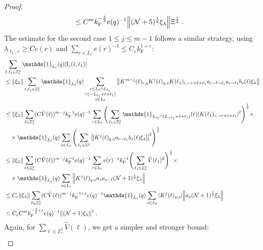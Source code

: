 \documentclass[12pt,a4paper]{article}
\numberwithin{equation}{section}
\newcommand{\1}{\mathbb{I}}
\newcommand{\F}{\mathrm{F}}
\newcommand{\I}{\mathrm{I}}
\newcommand{\Z}{\mathbb{Z}}
\newcommand{\NN}{\mathcal{N}}
\newcommand{\half}{\frac{1}{2}}
\theoremstyle{plain}
\theoremstyle{definition}
\theoremstyle{remark}
\theoremstyle{plain}
\theoremstyle{definition}
\theoremstyle{remark}
\begin{document}
\begin{proof}
\begin{align}
	 &\leq C^m
	 	k_{\F}^{-\frac 32} e(q)^{-1}
	 	\norm{(\NN+5)^{\half} \xi_\lambda}
	 	\Xi^{\half} \;.
\label{eq:estEQ1121}
\end{align}
The estimate for the second case $ 1 \le j \le m-1 $ follows a similar strategy, using $ \lambda_{\ell_1,r} \ge C e(r) $ and $ \sum_{r \in L_\ell} e(r)^{-1} \le C_\varepsilon k_{\F}^{1+\varepsilon} $:
\begin{align}
	&\sum_{\ell,\ell_1 \in \Z^3_*} \mathds{1}_{L_\ell}(q) |\I_j(\ell, \ell_1)| \nonumber\\
	&\leq \norm{ \xi_\lambda} \sum_{\ell,\ell_1 \in \Z^3_*} \mathds{1}_{L_\ell}(q)
		\sum\limits_{\substack{r\in L_{\ell} \cap L_{\ell_1} \\ \cap (-L_{\ell_1} + \ell + \ell_1)\\s\in L_{\ell}}}
		\norm{K^{m-j}(\ell)_{r,q} K^j(\ell)_{q,s} K(\ell_1)_{r,-r+\ell+\ell_1} a_{r-\ell-\ell_1} a_{r-\ell_1} b_{s}(\ell) \xi_\lambda }\nonumber\\
	&\leq \norm{ \xi_\lambda} 
		\sum_{\ell \in \Z^3_*}
		(C \hat{V}(\ell))^{m-j} k_{\F}^{-1} e(q)^{-1}
		\sum\limits_{r \in L_\ell} \Bigg(\sum_{\ell_1 \in \Z^3_*} \mathds{1}_{L_{\ell_1} \cap (L_{-\ell_1}+\ell+\ell_1)}(r) \abs{ K(\ell_1)_{r,-r+\ell+\ell_1} }^2\Bigg)^\half \times\nonumber\\ 
	&\quad \times \mathds{1}_{L_\ell}(q) \sum\limits_{s\in L_{\ell}} \Bigg( \sum_{\ell_1 \in \Z^3} \norm{K^{j}(\ell)_{q,s} a_{r-\ell_1} b_{s}(\ell) \xi_\lambda }^2 \Bigg)^\half \nonumber\\
	&\leq \norm{ \xi_\lambda} 
		\sum_{\ell \in \Z^3_*}
		(C \hat{V}(\ell))^{m-j} k_{\F}^{-1} e(q)^{-1}
		\sum\limits_{r \in L_\ell} e(r)^{-1} k_{\F}^{-1} \Bigg(\sum_{\ell_1 \in \Z^3_*} \hat{V}(\ell_1)^2 \Bigg)^\half \times\nonumber\\ 
	&\quad \times \mathds{1}_{L_\ell}(q) \sum\limits_{s\in L_{\ell}} \norm{K^{j}(\ell)_{q,s} a_s a_{s-\ell} (\NN+1)^{\half} \xi_\lambda } \nonumber\\
	&\leq C_\varepsilon \norm{ \xi_\lambda} 
		\sum_{\ell \in \Z^3_*}
		(C \hat{V}(\ell))^{m-j} k_{\F}^{-1+\varepsilon} e(q)^{-1}
		\mathds{1}_{L_\ell}(q)
		\sum\limits_{s\in L_{\ell}} |K^{j}(\ell)_{q,s}| \norm{a_s (\NN+1)^{\half} \xi_\lambda } \nonumber\\
	&\leq C_\varepsilon C^m k_{\F}^{-\frac 32 + \varepsilon} e(q)^{-1} \norm{(\NN+1) \xi_\lambda }^2 \;. \label{eq:estEQ1122_Coulomb}
\end{align}
Again, for $ \sum_{\ell \in \Z^3_*} \hat{V}(\ell) $, we get a simpler and stronger bound:
\begin{align}

\end{align}
\end{proof}
\end{document}
